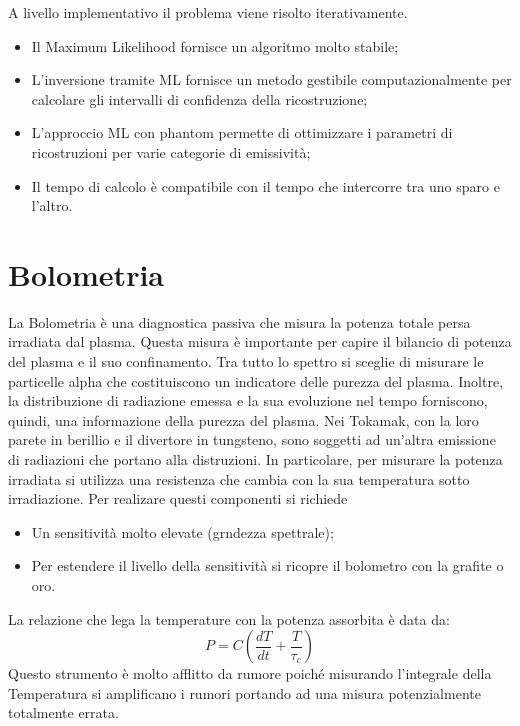 \documentclass{article}
\begin{document}
A livello implementativo il problema viene risolto iterativamente.
\begin{itemize}
	\item Il Maximum Likelihood fornisce un algoritmo molto stabile;
	\item L'inversione tramite ML fornisce un metodo gestibile computazionalmente per calcolare gli intervalli di confidenza della ricostruzione;
	\item L'approccio ML con phantom permette di ottimizzare i parametri di ricostruzioni per varie categorie di emissività;
	\item Il tempo di calcolo è compatibile con il tempo che intercorre tra uno sparo e l'altro.
\end{itemize}
\section{Bolometria}
La Bolometria è una diagnostica passiva che misura la potenza totale persa irradiata dal plasma. Questa misura è importante per capire il bilancio di potenza del plasma e il suo confinamento.\newline
Tra tutto lo spettro si sceglie di misurare le particelle alpha che costituiscono un indicatore delle purezza del plasma. Inoltre, la distribuzione di radiazione emessa e la sua evoluzione nel tempo forniscono, quindi, una informazione della purezza del plasma.\newline
Nei Tokamak, con la loro parete in berillio e il divertore in tungsteno, sono soggetti ad un'altra emissione di radiazioni che portano alla distruzioni.\newline
In particolare, per misurare la potenza irradiata si utilizza una resistenza che cambia con la sua temperatura sotto irradiazione. Per realizare questi componenti si richiede\begin{itemize}
	\item Un sensitività molto elevate (grndezza spettrale);
	\item Per estendere il livello della sensitività si ricopre il bolometro con la grafite o oro.
\end{itemize}
La relazione che lega la temperature con la potenza assorbita è data da:
\begin{equation*}
	P=C(\frac{dT}{dt}+\frac{T}{\tau_{c}})
\end{equation*}
Questo strumento è molto afflitto da rumore poiché misurando l'integrale della Temperatura si amplificano i rumori portando ad una misura potenzialmente totalmente errata.
\end{document}
